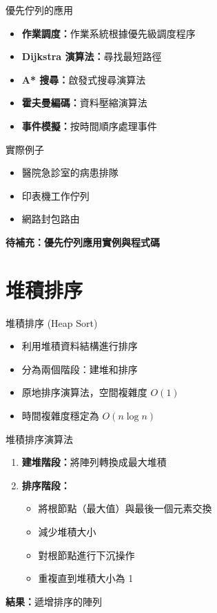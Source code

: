 \documentclass{beamer}
\begin{document}
\begin{frame}{優先佇列的應用}
\begin{itemize}
    \item \textbf{作業調度：}作業系統根據優先級調度程序
    \item \textbf{Dijkstra 演算法：}尋找最短路徑
    \item \textbf{A* 搜尋：}啟發式搜尋演算法
    \item \textbf{霍夫曼編碼：}資料壓縮演算法
    \item \textbf{事件模擬：}按時間順序處理事件
\end{itemize}

\vspace{1em}
\begin{block}{實際例子}
\begin{itemize}
    \item 醫院急診室的病患排隊
    \item 印表機工作佇列
    \item 網路封包路由
\end{itemize}
\end{block}

\vspace{1em}
\textbf{待補充：優先佇列應用實例與程式碼}
\end{frame}

\section{堆積排序}

\begin{frame}{堆積排序 (Heap Sort)}
\begin{itemize}
    \item 利用堆積資料結構進行排序
    \item 分為兩個階段：建堆和排序
    \item 原地排序演算法，空間複雜度 $O(1)$
    \item 時間複雜度穩定為 $O(n \log n)$
\end{itemize}

\vspace{1em}
\begin{block}{堆積排序演算法}
\begin{enumerate}
    \item \textbf{建堆階段：}將陣列轉換成最大堆積
    \item \textbf{排序階段：}
    \begin{itemize}
        \item 將根節點（最大值）與最後一個元素交換
        \item 減少堆積大小
        \item 對根節點進行下沉操作
        \item 重複直到堆積大小為 1
    \end{itemize}
\end{enumerate}
\end{block}

\vspace{1em}
\textbf{結果：}遞增排序的陣列
\end{frame}
\end{document}
